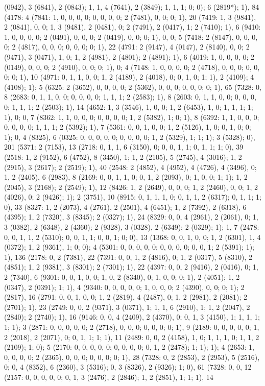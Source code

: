 {(0942), 3 (6841), 2 (0843); 1, 1, 4 (7641), 2 (3849); 1, 1, 1; 0; 0); 6 (2819*); 1), 84 (4178: 4 (7841: 1, 0, 0, 0, 0; 0, 0, 0, 0; 2 (7481), 0, 0; 0; 1), 20 (7419: 1, 3 (9841), 2 (0841), 0, 0; 1, 3 (9481), 2 (0481), 0; 2 (7491), 2 (0417), 1; 2 (7410); 1), 6 (9410: 1, 0, 0, 0, 0; 2 (0491), 0, 0, 0; 2 (0419), 0, 0; 0; 1), 0, 0; 5 (7418: 2 (8147), 0, 0, 0, 0; 2 (4817), 0, 0, 0; 0, 0, 0; 0; 1), 22 (4791: 2 (9147), 4 (0147), 2 (8140), 0, 0; 2 (9471), 3 (0471), 1, 0; 1, 2 (4981), 2 (4801); 2 (4891); 1), 6 (4019: 1, 0, 0, 0, 0; 2 (0149), 0, 0, 0; 2 (4910), 0, 0; 0; 1), 0; 4 (7148: 1, 0, 0, 0, 0; 2 (4718), 0, 0, 0; 0, 0, 0; 0; 1), 10 (4971: 0, 1, 1, 0, 0; 1, 2 (4189), 2 (4018), 0; 0, 1, 0; 1; 1), 2 (4109); 4 (4108); 1); 5 (6325: 2 (3652), 0, 0, 0, 0; 2 (5362), 0, 0, 0; 0, 0, 0; 0; 1), 65 (7328: 0, 8 (2683: 0, 1, 1, 0, 0; 0, 0, 0, 0; 1, 1, 1; 2 (2583); 1), 8 (2603: 0, 1, 1, 0, 0; 0, 0, 0, 0; 1, 1, 1; 2 (2503); 1), 14 (4652: 1, 3 (3546), 1, 0, 0; 1, 2 (6453), 1, 0; 1, 1, 1; 1; 1), 0; 0, 7 (8362: 1, 1, 0, 0, 0; 0, 0, 0, 0; 1, 2 (5382), 1; 0; 1), 8 (6392: 1, 1, 0, 0, 0; 0, 0, 0, 0; 1, 1, 1; 2 (5392); 1), 7 (5361: 0, 0, 1, 0, 0; 1, 2 (5126), 1, 0; 0, 1, 0; 0; 1); 0, 4 (8325), 6 (0325: 0, 0, 0, 0, 0; 0, 0, 0, 0; 1, 2 (5329), 1; 1; 1); 3 (5328); 0), 201 (5371: 2 (7153), 13 (2718: 0, 1, 1, 6 (3150), 0; 0, 0, 1, 1; 0, 1, 1; 1; 0), 39 (2518: 1, 2 (9152), 6 (4752), 8 (3450), 1; 1, 2 (2105), 5 (2745), 4 (3016); 1, 2 (2915), 3 (2617); 2 (2519); 1), 40 (2548: 2 (4852), 4 (4952), 4 (4726), 4 (3496), 0; 1, 2 (2405), 6 (2983), 8 (2169: 0, 0, 1, 1, 0; 0, 1, 2 (2093), 0; 1, 0, 0; 1; 1); 1, 2 (2045), 3 (2168); 2 (2549); 1), 12 (8426: 1, 2 (2649), 0, 0, 0; 1, 2 (2460), 0, 0; 1, 2 (4026), 0; 2 (9426); 1); 2 (3751), 10 (8915: 0, 1, 1, 1, 0; 0, 1, 1, 2 (6317); 0, 1, 1; 1; 0), 33 (8327: 1, 2 (2073), 4 (2761), 2 (2501), 4 (6451); 1, 2 (7392), 2 (6318), 6 (4395); 1, 2 (7320), 3 (8345); 2 (0327); 1), 24 (8329: 0, 0, 4 (2961), 2 (2061), 0; 1, 3 (0382), 2 (6348), 2 (4360); 2 (9328), 3 (0328), 2 (6349); 2 (0329); 1); 1, 7 (2478: 0, 0, 1, 1, 2 (5310); 0, 0, 1, 1; 0, 0, 1; 0; 0), 13 (1368: 0, 0, 1, 0, 0; 1, 2 (6301), 1, 4 (0372); 1, 2 (9361), 1; 0; 0); 4 (5301: 0, 0, 0, 0, 0; 0, 0, 0, 0; 0, 0, 1; 2 (5391); 1); 1), 136 (2178: 0, 2 (7381), 22 (7391: 0, 0, 1, 2 (4816), 0; 1, 2 (0317), 5 (8310), 2 (4851); 1, 2 (9381), 3 (8301); 2 (7301); 1), 22 (4397: 0, 0, 2 (9416), 2 (0416), 0; 1, 2 (7340), 6 (9301: 0, 0, 1, 0, 0; 1, 0, 2 (8340), 0; 1, 0, 0; 0; 1), 2 (4051); 1, 2 (0347), 2 (0391); 1; 1), 4 (9340: 0, 0, 0, 0, 0; 1, 0, 0, 0; 2 (4390), 0, 0; 0; 1); 2 (2817), 16 (2791: 0, 0, 1, 0, 0; 1, 2 (2819), 4 (2487), 0; 1, 2 (2981), 2 (2081); 2 (2701); 1), 23 (2749: 0, 0, 2 (9371), 3 (0371), 1; 1, 1, 6 (2910), 1; 1, 2 (2047), 2 (2840); 2 (2740); 1), 16 (9146: 0, 0, 4 (2409), 2 (4370), 0; 0, 1, 3 (4150), 1; 1, 1, 1; 1; 1); 3 (2871: 0, 0, 0, 0, 0; 2 (2718), 0, 0, 0; 0, 0, 0; 0; 1), 9 (2189: 0, 0, 0, 0, 0; 1, 2 (2018), 2 (2071), 0; 0, 1, 1; 1; 1), 11 (2489: 0, 0, 2 (4158), 1, 0; 1, 1, 1, 0; 1, 1, 2 (2109); 1; 0); 5 (2170: 0, 0, 0, 0, 0; 0, 0, 0, 0; 0, 1, 2 (2478); 1; 1); 1); 4 (2653: 1, 0, 0, 0, 0; 2 (2365), 0, 0, 0; 0, 0, 0; 0; 1), 28 (7328: 0, 2 (2853), 2 (2953), 5 (2516), 0; 0, 4 (8352), 6 (2360), 3 (5316); 0, 3 (8326), 2 (9326); 1; 0), 61 (7328: 0, 0, 12 (2157: 0, 0, 0, 0, 0; 0, 1, 3 (2476), 2 (2846); 1, 2 (2851), 1; 1; 1), 14 }
